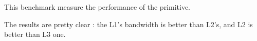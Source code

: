 
This benchmark measure the performance of the  primitive.

The results are pretty clear : the L1's bandwidth is better than L2's, and L2 is better than L3 one.